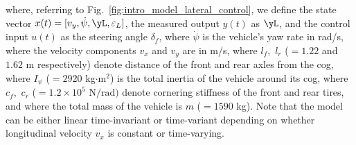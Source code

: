  where, referring to Fig.~\ref{fig:intro_model_lateral_control}, we define the state vector $x(t) = [v_{y}, \dot{\psi}, \yL, \varepsilon_{L}]$, the measured output $y(t)$ as $\yL$, and the control input $u(t)$ as the steering angle $\delta_f$, where
$\dot{\psi}$ is the vehicle's yaw rate in rad/s, where the velocity components $v_x$ and $v_y$ are in m/s, where $l_{f}$,\ $l_{r}$ ($=1.22$ and $1.62$ m respectively) denote distance of the front and rear axles from the \gls{cog}, where 
$I_{\psi}$ ($=2920$ kg$\cdot$m$^2$) is the total inertia of the vehicle around its \gls{cog}, where
$c_{f}$,\ $c_{r}$ (${=1.2\times10^5\text{~N/rad)}}$ denote cornering stiffness of the front and rear tires, and where the total mass of the vehicle is $m$ ($=1590$ kg). Note that the model can be either linear time-invariant or time-variant depending on whether longitudinal velocity $v_x$ is constant or time-varying. 